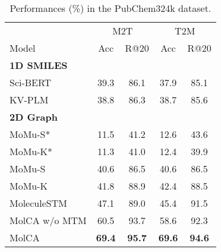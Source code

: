 \documentclass[11pt]{article}
\begin{document}
\begin{table}[t!]
    \small
    \centering
    \begin{subtable}[t]{0.45\textwidth}
    \small
    \centering
    \begin{tabular}{lcccc} \toprule
                        & \multicolumn{2}{c}{M2T}             & \multicolumn{2}{c}{T2M}                \\\cmidrule(lr){2-3} \cmidrule(lr){4-5}
    Model              & Acc               & R@20                 & Acc                  & R@20                 \\ \midrule
    \multicolumn{2}{l}{\textbf{1D SMILES}} & \multicolumn{1}{l}{} & \multicolumn{1}{l}{} & \multicolumn{1}{l}{} \\
    Sci-BERT           & 39.3              & 86.1                 & 37.9                 & 85.1                 \\
    KV-PLM             & 38.8              & 86.3                 & 38.7                 & 85.6                 \\\midrule
    \multicolumn{2}{l}{\textbf{2D Graph}}  & \multicolumn{1}{l}{} & \multicolumn{1}{l}{} & \multicolumn{1}{l}{} \\
    MoMu-S*            & 11.5              & 41.2                 & 12.6                 & 43.6                 \\
    MoMu-K*            & 11.3              & 41.0                 & 12.4                 & 39.9                 \\
    MoMu-S             & 40.6              & 86.5                 & 40.6                 & 86.5                 \\
    MoMu-K             & 41.8              & 88.9                 & 42.4                 & 88.5                 \\
    MoleculeSTM        & 47.1              & 89.0                 & 45.4                 & 91.5                 \\
    MolCA w/o MTM      & 60.5              & 93.7                 & 58.6                 & 92.3                 \\
    MolCA              & \textbf{69.4}     & \textbf{95.7}        & \textbf{69.6}        & \textbf{94.6}       \\\bottomrule
    \end{tabular}
    \caption{Performances (\%) in the PubChem324k dataset. }
    \label{tab:retrieve_pubchem}
    \end{subtable}
    \begin{subtable}[t]{0.45\textwidth}

\end{subtable}
\end{table}
\end{document}
